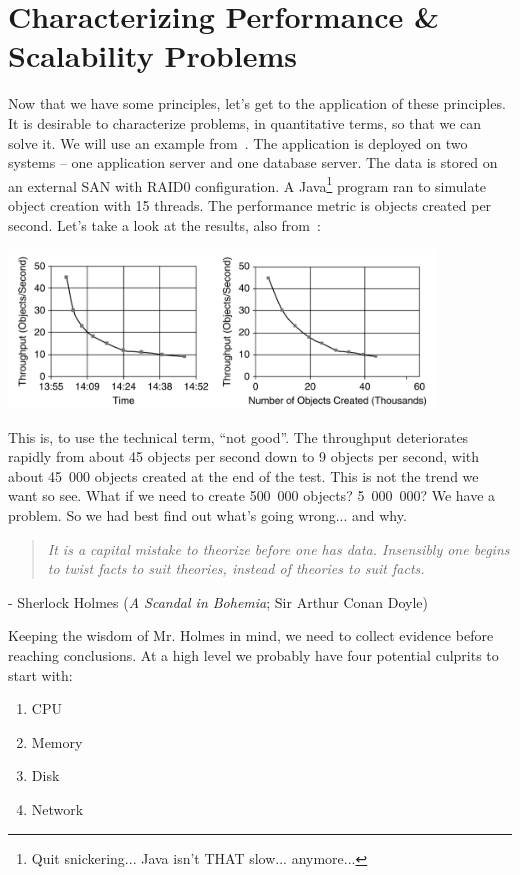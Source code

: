 \documentclass[a4paper]{report}
\begin{document}
\section*{Characterizing Performance \& Scalability Problems}

Now that we have some principles, let's get to the application of these principles. It is desirable to characterize problems, in quantitative terms, so that we can solve it. We will use an example from~\cite{swps}. The application is deployed on two systems -- one application server and one database server. The data is stored on an external SAN with RAID0 configuration. A Java\footnote{Quit snickering... Java isn't THAT slow... anymore...} program ran to simulate object creation with 15 threads. The performance metric is objects created per second. Let's take a look at the results, also from~\cite{swps}:

\begin{center}
	\includegraphics[width=0.85\textwidth]{images/batch-job-scalability.png}
\end{center}

This is, to use the technical term, ``not good''. The throughput deteriorates rapidly from about 45 objects per second down to 9 objects per second, with about 45~000 objects created at the end of the test. This is not the trend we want so see. What if we need to create 500~000 objects? 5~000~000? We have a problem. So we had best find out what's going wrong... and why.

\begin{quote}
\textit{It is a capital mistake to theorize before one has data. Insensibly one begins to twist facts to suit theories, instead of theories to suit facts.}
\end{quote}
\hfill - Sherlock Holmes (\textit{A Scandal in Bohemia}; Sir Arthur Conan Doyle)

Keeping the wisdom of Mr. Holmes in mind, we need to collect evidence before reaching conclusions. At a high level we probably have four potential culprits to start with:
\begin{enumerate}
	\item CPU
	\item Memory
	\item Disk
	\item Network
\end{enumerate}
\end{document}
